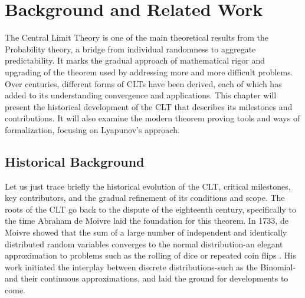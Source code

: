 \chapter[Background and Related Work]{Background and Related Work}
\label{chap:2}



The Central Limit Theory is one of the main theoretical results from the  Probability theory, a bridge from individual randomness to aggregate predictability. It marks the gradual approach of mathematical rigor and upgrading of the theorem used by addressing more and more difficult problems. Over centuries, different forms of CLTs have been derived, each of which has added to its understanding convergence and applications. This chapter will present the historical development of the CLT that describes its milestones and contributions. It will also examine the modern theorem proving tools and ways of formalization, focusing on Lyapunov's approach.

\section{Historical Background}
Let us just trace briefly the historical evolution of the CLT, critical milestones, key contributors, and the gradual refinement of its conditions and scope. The roots of the CLT go back to the dispute of the eighteenth century, specifically to the time Abraham de Moivre laid the foundation for this theorem. In 1733, de Moivre showed that the sum of a large number of independent and identically distributed random variables converges to the normal distribution-an elegant approximation to problems such as the rolling of dice or repeated coin flips \cite{de1733approximatio}. His work initiated the interplay between discrete distributions-such as the Binomial-and their continuous approximations, and laid the ground for developments to come.

